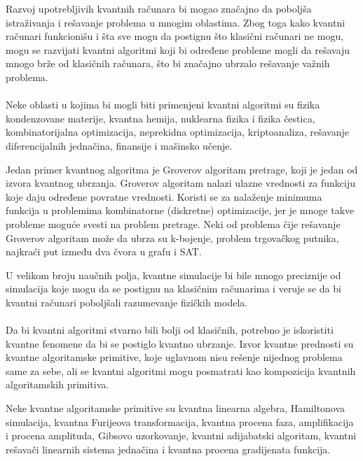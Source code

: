 \documentclass[fleqn, 12pt]{article}
\begin{document}
\begin{text}
Razvoj upotrebljivih kvantnih računara bi mogao značajno da poboljša istraživanja i rešavanje problema u mnogim oblastima. Zbog toga kako kvantni računari funkcionišu i šta sve mogu da postignu što klasični računari ne mogu, mogu se razvijati kvantni algoritmi koji bi određene probleme mogli da rešavaju mnogo brže od klasičnih računara, što bi značajno ubrzalo rešavanje važnih problema.
\\\\

Neke oblasti u kojima bi mogli biti primenjeni kvantni algoritmi su fizika kondenzovane materije, kvantna hemija, nuklearna fizika i fizika čestica, kombinatorijalna optimizacija, neprekidna optimizacija, kriptoanaliza, rešavanje diferencijalnih jednačina, finansije i mašinsko učenje. \cite{G2}

Jedan primer kvantnog algoritma je Groverov algoritam pretrage, koji je jedan od izvora kvantnog ubrzanja. Groverov algoritam nalazi ulazne vrednosti za funkciju koje daju određene povratne vrednosti. \cite{G1} Koristi se za nalaženje minimuma funkcija u problemima kombinatorne (diskretne) optimizacije, jer je mnoge takve probleme moguće svesti na problem pretrage. Neki od problema čije rešavanje Groverov algoritam može da ubrza su k-bojenje, problem trgovačkog putnika, najkraći put između dva čvora u grafu i SAT. \cite{G2}

U velikom broju naučnih polja, kvantne simulacije bi bile mnogo preciznije od simulacija koje mogu da se postignu na klasičnim računarima i veruje se da bi kvantni računari poboljšali razumevanje fizičkih modela. 
\\\\

Da bi kvantni algoritmi stvarno bili bolji od klasičnih, potrebno je iskoristiti kvantne fenomene da bi se postiglo kvantno ubrzanje. Izvor kvantne prednosti su kvantne algoritamske primitive, koje uglavnom nisu rešenje nijednog problema same za sebe, ali se kvantni algoritmi mogu posmatrati kao kompozicija kvantnih algoritamskih primitiva. \cite{G2}

Neke kvantne algoritamske primitive su kvantna linearna algebra, Hamiltonova simulacija, kvantna Furijeova transformacija, kvantna procena faza, amplifikacija i procena amplituda, Gibsovo uzorkovanje, kvantni adijabatski algoritam, kvantni rešavači linearnih sistema jednačina i kvantna procena gradijenata funkcija.
\\\\


\end{text}
\end{document}
